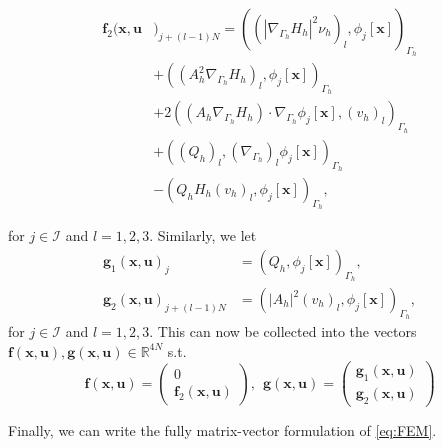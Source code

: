 \begin{equation*}
    \begin{split}
        \mathbf{f}_{2}( \mathbf{x}, \mathbf{u}&)_{j + (l-1)N} = ( ( \left\lvert \nabla _{\Gamma _{h}} H_{h} \right\rvert ^2 \nu _{h})_{l} , \phi_{j}\left[ \mathbf{x} \right]   ) _{\Gamma _{h}}   \\
        & + ((A_{h}^2 \nabla _{\Gamma _{h}}H_{h})_{l}, \phi _{j} \left[ \mathbf{x} \right]  )_{\Gamma _{h}} \\
        & + 2((A_{h} \nabla _{\Gamma _{h}} H_{h})\cdot \nabla _{\Gamma _{h}} \phi _{j} \left[ \mathbf{x} \right] , ( v_{h}) _{l})_{\Gamma _{h}} \\
    & + \left((Q_{h})_{l},  ( \nabla _{\Gamma _{h}} )_{l} \phi_{j} \left[ \mathbf{x} \right]  \right)_{\Gamma _{h}} \\
    &- \left(Q_{h} H_{h} ( v_{h}) _{l}, \phi _{j} \left[ \mathbf{x} \right]   \right)_{\Gamma_{h} },
    \end{split}
\end{equation*}

for $j \in \mathcal{I} $ and $l = 1,2,3$. Similarly, we let
\[
    \begin{split}
\mathbf{g}_{1}( \mathbf{x}, \mathbf{u}) _{j} & = \left( Q_{h}, \phi _{j}\left[ \mathbf{x} \right]  \right) _{\Gamma _{h}}, \\
\mathbf{g}_{2}\left( \mathbf{x}, \mathbf{u} \right)_{j + (l-1)N} & = \left( \left\lvert A_{h} \right\rvert ^2 ( v_{h}) _{l}, \phi _{j} \left[ \mathbf{x} \right]  \right)     _{\Gamma _{h}},
    \end{split}
\]
for $j \in \mathcal{I} $ and $l=1,2,3$.
This can now be collected into the vectors $\mathbf{f}( \mathbf{x}, \mathbf{u}), \mathbf{g}(\mathbf{x},\mathbf{u} ) \in \mathbb{R} ^{4N}  $ s.t. \[
\mathbf{f}( \mathbf{x}, \mathbf{u}) = \begin{pmatrix}
0\\
\mathbf{f}_{2}(\mathbf{x},\mathbf{u} )
\end{pmatrix}
, \ \ \mathbf{g} (\mathbf{x}, \mathbf{u})
 = \begin{pmatrix}
\mathbf{g}_{1}( \mathbf{x}, \mathbf{u}) \\
\mathbf{g}_{2}( \mathbf{x}, \mathbf{u})
\end{pmatrix}
\]

Finally, we can write the fully matrix-vector formulation of \eqref{eq:FEM}.

